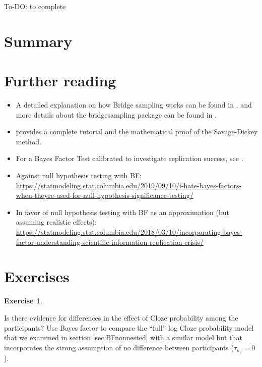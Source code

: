 \documentclass[12pt,]{krantz}
\providecommand{\tightlist}{%
  \setlength{\itemsep}{0pt}\setlength{\parskip}{0pt}}
\theoremstyle{definition}
\theoremstyle{definition}
\theoremstyle{definition}
\newtheorem{exercise}{Exercise}[chapter]
\theoremstyle{remark}
\begin{document}
To-DO: to complete

\section{Summary}\label{summary-4}

\section{Further reading}\label{further-reading-6}

\begin{itemize}
\tightlist
\item
  A detailed explanation on how Bridge sampling works can be found in
  \citet{gronauTutorialBridgeSampling2017}, and more details about the
  bridgesampling package can be found in
  \citet{gronauBridgesamplingPackageEstimating2017}.
\item
  \citet{wagenmakers2010BayesianHypothesisTesting} provides a complete
  tutorial and the mathematical proof of the Savage-Dickey method.
\item
  For a Bayes Factor Test calibrated to investigate replication success,
  see \citet{verhagenBayesianTestsQuantify2014}.
\item
  Against null hypothesis testing with BF:
  \url{https://statmodeling.stat.columbia.edu/2019/09/10/i-hate-bayes-factors-when-theyre-used-for-null-hypothesis-significance-testing/}
\item
  In favor of null hypothesis testing with BF as an approximation (but
  assuming realistic effects):
  \url{https://statmodeling.stat.columbia.edu/2018/03/10/incorporating-bayes-factor-understanding-scientific-information-replication-crisis/}
\end{itemize}

\section{Exercises}\label{exercises-5}

\begin{exercise}
\protect\hypertarget{exr:byparticipants}{}{\label{exr:byparticipants} }
\end{exercise}

\vspace{-.5cm} Is there evidence for differences in the effect of Cloze
probability among the participants? Use Bayes factor to compare the
``full'' log Cloze probability model that we examined in section
\ref{sec:BFnonnested} with a similar model but that incorporates the
strong assumption of no difference between participants
(\(\tau_{u_2}=0\)).
\end{document}
